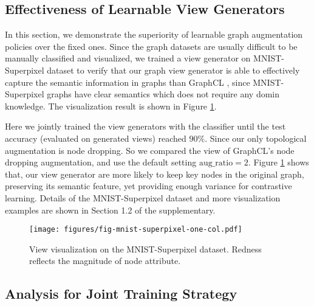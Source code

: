 \subsection{Effectiveness of Learnable View Generators}
\label{sec-mnist-exp}

In this section, we demonstrate the superiority of learnable graph augmentation policies over the fixed ones. Since the graph datasets are usually difficult to be manually classified and visualized, we trained a view generator on MNIST-Superpixel dataset \cite{monti2017mnistsuperpix} to verify that our graph view generator is able to effectively capture the semantic information in graphs than GraphCL \cite{you2020graphcl}, since MNIST-Superpixel graphs have clear semantics which does not require any domin knowledge. The visualization result is shown in Figure \ref{fig-mnist-superpixel-vis}.

Here we jointly trained the view generators with the classifier until the test accuracy (evaluated on generated views) reached $90\%$. Since our only topological augmentation is node dropping. So we compared the view of GraphCL's node dropping augmentation, and use the default setting $\text{aug\_ratio}=2$. Figure \ref{fig-mnist-superpixel-vis} shows that, our view generator are more likely to keep key nodes in the original graph, preserving its semantic feature, yet providing enough variance for contrastive learning. Details of the MNIST-Superpixel dataset and more visualization examples are shown in Section 1.2 of the supplementary.

\begin{figure}[tbp]
    \begin{center}
    \texttt{[image: figures/fig-mnist-superpixel-one-col.pdf]}
    \end{center}
    \vspace{-0.4cm}
    \caption{View visualization on the MNIST-Superpixel dataset. Redness reflects the magnitude of node attribute.}
    \vspace{-0.1cm}
    \label{fig-mnist-superpixel-vis}
\end{figure}

\subsection{Analysis for Joint Training Strategy}
\label{sec-joint-strategy-analysis}


